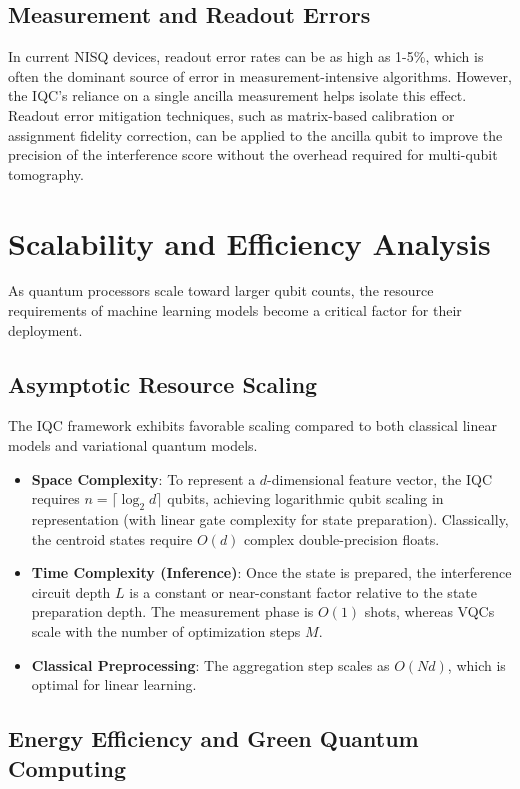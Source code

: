 \documentclass[conference]{IEEEtran}
\begin{document}
\subsection{Measurement and Readout Errors}

In current NISQ devices, readout error rates can be as high as 1-5\%, which is often the dominant source of error in measurement-intensive algorithms. However, the IQC's reliance on a single ancilla measurement helps isolate this effect. Readout error mitigation techniques, such as matrix-based calibration or assignment fidelity correction, can be applied to the ancilla qubit to improve the precision of the interference score without the overhead required for multi-qubit tomography.

\section{Scalability and Efficiency Analysis}

As quantum processors scale toward larger qubit counts, the resource requirements of machine learning models become a critical factor for their deployment.

\subsection{Asymptotic Resource Scaling}

The IQC framework exhibits favorable scaling compared to both classical linear models and variational quantum models. 
\begin{itemize}
    \item \textbf{Space Complexity}: To represent a $d$-dimensional feature vector, the IQC requires $n = \lceil \log_2 d \rceil$ qubits, achieving logarithmic qubit scaling in representation (with linear gate complexity for state preparation). Classically, the centroid states require $O(d)$ complex double-precision floats.
    \item \textbf{Time Complexity (Inference)}: Once the state is prepared, the interference circuit depth $L$ is a constant or near-constant factor relative to the state preparation depth. The measurement phase is $O(1)$ shots, whereas VQCs scale with the number of optimization steps $M$.
    \item \textbf{Classical Preprocessing}: The aggregation step scales as $O(Nd)$, which is optimal for linear learning.
\end{itemize}

\subsection{Energy Efficiency and Green Quantum Computing}
\end{document}
